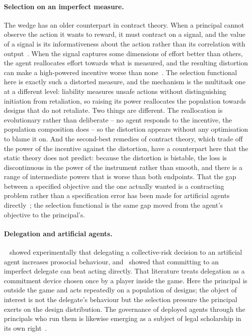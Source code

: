 \documentclass[pdflatex]{sn-jnl}
\theoremstyle{thmstyleone}
\theoremstyle{thmstylethree}
\theoremstyle{thmstyletwo}
\begin{document}
\paragraph{Selection on an imperfect measure.}
The wedge has an older counterpart in contract theory. When a principal cannot
observe the action it wants to reward, it must contract on a signal, and the
value of a signal is its informativeness about the action rather than its
correlation with output~\citep{holmstrom1979moral}. When the signal captures
some dimensions of effort better than others, the agent reallocates effort
towards what is measured, and the resulting distortion can make a
high-powered incentive worse than none~\citep{baker1992incentive,
holmstrom1991multitask}. The selection functional here is exactly such a
distorted measure, and the mechanism is the multitask one at a different
level: liability measures unsafe actions without distinguishing initiation
from retaliation, so raising its power reallocates the population towards
designs that do not retaliate. Two things are different. The reallocation is
evolutionary rather than deliberate -- no agent responds to the incentive, the
population composition does -- so the distortion appears without any
optimisation to blame it on. And the second-best remedies of contract theory,
which trade off the power of the incentive against the distortion, have a
counterpart here that the static theory does not predict: because the
distortion is bistable, the loss is discontinuous in the power of the
instrument rather than smooth, and there is a range of intermediate powers
that is worse than both endpoints. That the gap between a specified objective
and the one actually wanted is a contracting problem rather than a
specification error has been made for artificial agents
directly~\citep{hadfieldmenell2019incomplete}; the selection functional is the
same gap moved from the agent's objective to the principal's.

\paragraph{Delegation and artificial agents.}~\citet{domingos2022delegation} showed experimentally that delegating a
collective-risk decision to an artificial agent increases prosocial behaviour,
and~\citet{terrucha2024committing} showed that committing to an imperfect
delegate can beat acting directly. That literature treats delegation as a
commitment device chosen once by a player inside the game. Here the principal
is outside the game and acts repeatedly on a population of designs; the object
of interest is not the delegate's behaviour but the selection pressure the
principal exerts on the design distribution. The governance of deployed agents
through the principals who run them is likewise emerging as a subject of legal
scholarship in its own right~\citep{kolt2025governing}.
\end{document}
